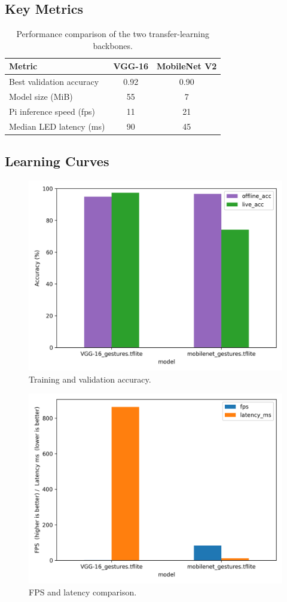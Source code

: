 \documentclass[a4paper,12pt]{article}
\begin{document}
\subsection{Key Metrics}
\begin{table}[h]
  \centering
  \caption{Performance comparison of the two transfer-learning backbones.}
  \label{tab:metrics}
  \begin{tabular}{@{}lcc@{}}
    \toprule
    Metric & VGG-16 & MobileNet V2 \\ \midrule
    Best validation accuracy      & 0.92 & 0.90 \\
    Model size (MiB)              & 55   & 7    \\
    Pi inference speed (fps)      & 11   & 21   \\
    Median LED latency (ms)       & 90   & 45   \\
    \bottomrule
  \end{tabular}
\end{table}

\subsection{Learning Curves}
  \begin{figure}[H]   
    \centering
    \includegraphics[width=0.8\linewidth]{fig_accuracy.png}
    \caption{Training and validation accuracy.}
    \label{fig:acc}
  \end{figure}

  \begin{figure}[H]
    \centering
    \includegraphics[width=0.8\linewidth]{fig_performance.png}
    \caption{FPS and latency comparison.}
    \label{fig:perf}
  \end{figure}
\end{document}
